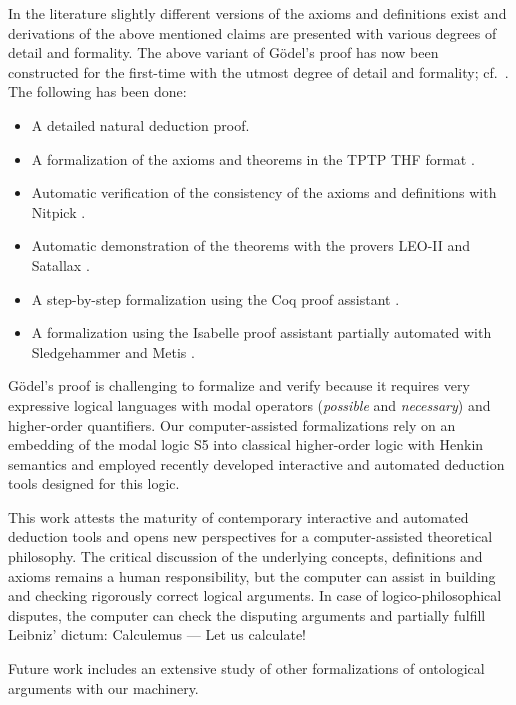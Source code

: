 \documentclass{llncs}
\begin{document}
In the literature \cite{ToDo} slightly different versions of the axioms and definitions exist 
and derivations of the above mentioned claims are presented with various degrees
of detail and formality. The above variant of G\"{o}del's proof has now been 
constructed for the first-time
with the utmost degree of detail and formality; cf.~\cite{ToDo:GitHubRepository}. The following has been done:
\begin{itemize}
\item A detailed natural deduction proof.
%
\item A formalization of the axioms and theorems in the TPTP THF format \cite{J22}.
%
\item Automatic verification of the consistency of the axioms and 
definitions with Nitpick \cite{Nitpick}.
%
\item Automatic demonstration of the theorems with the provers LEO-II \cite{LEO-II} and Satallax \cite{Satallax}.

\item A step-by-step formalization using the Coq proof assistant \cite{ToDo}.

\item A formalization using the Isabelle proof assistant \cite{Isabelle} partially automated with Sledgehammer \cite{ToDo} and Metis \cite{ToDo}.
\end{itemize}

G\"{o}del's proof is challenging to formalize and verify 
because it requires very expressive logical languages with 
modal operators (\emph{possible} and \emph{necessary}) and higher-order quantifiers. 
Our computer-assisted formalizations rely on an embedding of the modal logic S5 
into classical higher-order logic with Henkin 
semantics \cite{J23} and 
employed recently developed interactive and automated deduction tools designed for this logic.

This work attests the maturity of contemporary interactive and
automated deduction tools and opens new perspectives for a
computer-assisted theoretical philosophy.  
The critical discussion of the underlying concepts, definitions and
axioms remains a human responsibility, but the computer can assist in
building and checking rigorously correct logical arguments. In case of
logico-philosophical disputes, the computer can check the disputing
arguments and partially fulfill Leibniz' dictum: Calculemus --- Let us
calculate!

Future work includes an
extensive study of other formalizations of ontological arguments with
our machinery.



\end{document}
